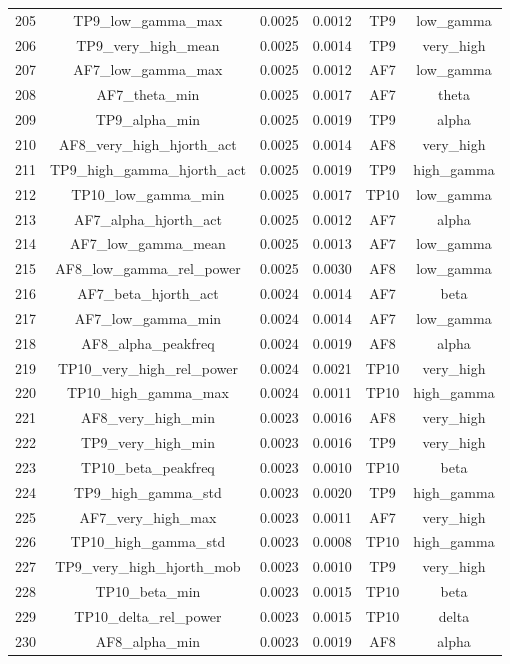 \begin{table}[hptb]
\begin{table}
\begin{tabular}{cccccc}
205 & TP9_low_gamma_max & 0.0025 & 0.0012 & TP9 & low_gamma \\
206 & TP9_very_high_mean & 0.0025 & 0.0014 & TP9 & very_high \\
207 & AF7_low_gamma_max & 0.0025 & 0.0012 & AF7 & low_gamma \\
208 & AF7_theta_min & 0.0025 & 0.0017 & AF7 & theta \\
209 & TP9_alpha_min & 0.0025 & 0.0019 & TP9 & alpha \\
210 & AF8_very_high_hjorth_act & 0.0025 & 0.0014 & AF8 & very_high \\
211 & TP9_high_gamma_hjorth_act & 0.0025 & 0.0019 & TP9 & high_gamma \\
212 & TP10_low_gamma_min & 0.0025 & 0.0017 & TP10 & low_gamma \\
213 & AF7_alpha_hjorth_act & 0.0025 & 0.0012 & AF7 & alpha \\
214 & AF7_low_gamma_mean & 0.0025 & 0.0013 & AF7 & low_gamma \\
215 & AF8_low_gamma_rel_power & 0.0025 & 0.0030 & AF8 & low_gamma \\
216 & AF7_beta_hjorth_act & 0.0024 & 0.0014 & AF7 & beta \\
217 & AF7_low_gamma_min & 0.0024 & 0.0014 & AF7 & low_gamma \\
218 & AF8_alpha_peakfreq & 0.0024 & 0.0019 & AF8 & alpha \\
219 & TP10_very_high_rel_power & 0.0024 & 0.0021 & TP10 & very_high \\
220 & TP10_high_gamma_max & 0.0024 & 0.0011 & TP10 & high_gamma \\
221 & AF8_very_high_min & 0.0023 & 0.0016 & AF8 & very_high \\
222 & TP9_very_high_min & 0.0023 & 0.0016 & TP9 & very_high \\
223 & TP10_beta_peakfreq & 0.0023 & 0.0010 & TP10 & beta \\
224 & TP9_high_gamma_std & 0.0023 & 0.0020 & TP9 & high_gamma \\
225 & AF7_very_high_max & 0.0023 & 0.0011 & AF7 & very_high \\
226 & TP10_high_gamma_std & 0.0023 & 0.0008 & TP10 & high_gamma \\
227 & TP9_very_high_hjorth_mob & 0.0023 & 0.0010 & TP9 & very_high \\
228 & TP10_beta_min & 0.0023 & 0.0015 & TP10 & beta \\
229 & TP10_delta_rel_power & 0.0023 & 0.0015 & TP10 & delta \\
230 & AF8_alpha_min & 0.0023 & 0.0019 & AF8 & alpha \\

\end{tabular}
\end{table}
\end{table}
